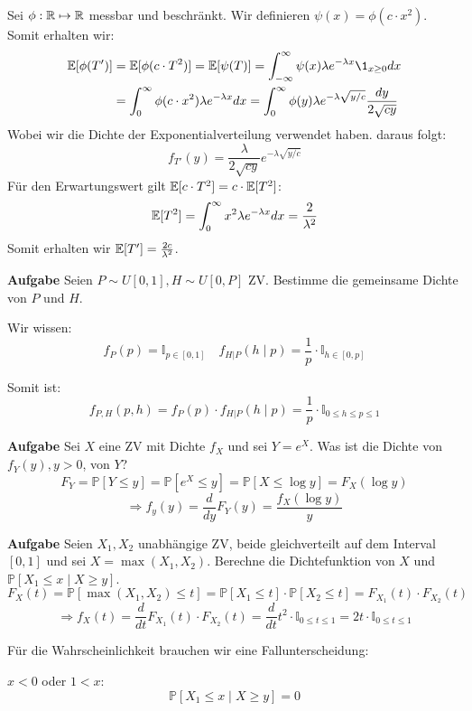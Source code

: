 Sei $\phi: \mathbb{R} \mapsto \mathbb{R}$ messbar und beschränkt. Wir definieren $\psi(x) = \phi(c \cdot x^2)$. Somit erhalten wir:
\begin{align*}
	\E[\phi(T')] &= \E[\phi(c \cdot T^2)] = \E[\psi(T)] = \int_{-\infty}^\infty \psi(x) \lambda e^{-\lambda x}\1_{x \geq 0}dx \\
	&= \int_0^\infty \phi(c \cdot x^2) \lambda e^{-\lambda x}dx = \int_0^\infty \phi(y) \lambda e^{-\lambda \sqrt{y / c}} \frac{dy}{2 \sqrt{cy}} \\
\end{align*}
Wobei wir die Dichte der Exponentialverteilung verwendet haben. daraus folgt:
$$f_{T'}(y) = \frac{\lambda}{2 \sqrt{cy}} e^{-\lambda \sqrt{y / c}}$$
Für den Erwartungswert gilt $\mathbb{E}[c \cdot T^2] = c \cdot \mathbb{E}[T^2]$:
$$\mathbb{E}[T^2] = \int_{0}^\infty x^2 \lambda e^{-\lambda x}dx = \frac{2}{\lambda^2}$$
Somit erhalten wir $\mathbb{E}[T'] = \frac{2c}{\lambda^2}$.

\hrulefill

\textbf{Aufgabe}
Seien $P \sim U[0,1], H \sim U[0, P]$ ZV. Bestimme die gemeinsame Dichte von $P$ und $H$. \smallskip

Wir wissen:
$$f_P(p) = \mathbb I_{p \in [0,1]} \quad f_{H | P}(h \; | \; p) = \frac{1}{p} \cdot \mathbb{I}_{h \in [0,p]}$$

Somit ist:
$$f_{P, H} (p, h) = f_P(p) \cdot f_{H | P}(h \; | \; p) = \frac{1}{p} \cdot \mathbb I_{0 \leq h \leq p \leq 1}$$

\hrulefill

\textbf{Aufgabe}
Sei $X$ eine ZV mit Dichte $f_X$ und sei $Y = e^X$. Was ist die Dichte von $f_Y(y), y>0$, von $Y$?
$$F_Y = \mathbb{P}[Y \leq y] = \mathbb{P}[e^X \leq y] = \mathbb{P}[X \leq \log y] = F_X(\log y)$$ 
$$\Rightarrow f_y(y) = \frac{d}{dy}F_Y(y) = \frac{f_X(\log y)}{y}$$

\hrulefill

\textbf{Aufgabe}
Seien $X_1, X_2$ unabhängige ZV, beide gleichverteilt auf dem Interval $[0,1]$ und sei $X = \max (X_1, X_2)$. Berechne die Dichtefunktion von $X$ und $\mathbb{P}[X_1 \leq x \; | \; X \geq y]$.
$$F_X(t) = \mathbb{P}[\max(X_1, X_2) \leq t] = \mathbb{P}[X_1 \leq t] \cdot \mathbb{P}[X_2 \leq t] = F_{X_1}(t) \cdot F_{X_2}(t)$$
$$\Rightarrow f_X(t) = \frac{d}{dt} F_{X_1}(t) \cdot F_{X_2}(t) = \frac{d}{dt} t^2 \cdot \mathbb{I}_{0 \leq t \leq 1} = 2t \cdot \mathbb{I}_{0 \leq t \leq 1}$$

Für die Wahrscheinlichkeit brauchen wir eine Fallunterscheidung: \smallskip

$x < 0$ oder $1 < x$:
$$\mathbb{P}[X_1 \leq x \; | \; X \geq y] = 0$$

